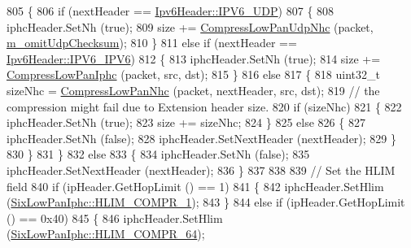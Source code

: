 \begin{DoxyCode}
805         \{
806           \textcolor{keywordflow}{if} (nextHeader == \hyperlink{classns3_1_1Ipv6Header_a226429221a066c5e3b1f260caf27d1e9aef42146d6b211521c22f827b04530253}{Ipv6Header::IPV6\_UDP})
807             \{
808               iphcHeader.SetNh (\textcolor{keyword}{true});
809               size += \hyperlink{classns3_1_1SixLowPanNetDevice_aa163cb1c6e2c82e208692f9bae9b5189}{CompressLowPanUdpNhc} (packet, 
      \hyperlink{classns3_1_1SixLowPanNetDevice_aa3503adbbb86b19e4ec2d17f3c8436f7}{m\_omitUdpChecksum});
810             \}
811           \textcolor{keywordflow}{else} \textcolor{keywordflow}{if} (nextHeader == \hyperlink{classns3_1_1Ipv6Header_a226429221a066c5e3b1f260caf27d1e9a2438a09074916d0e066627b28543ec7a}{Ipv6Header::IPV6\_IPV6})
812             \{
813               iphcHeader.SetNh (\textcolor{keyword}{true});
814               size += \hyperlink{classns3_1_1SixLowPanNetDevice_a67bf1501ba018d90c5bdb442371a3722}{CompressLowPanIphc} (packet, src, dst);
815             \}
816           \textcolor{keywordflow}{else}
817             \{
818               uint32\_t sizeNhc = \hyperlink{classns3_1_1SixLowPanNetDevice_a41d34fd1612e7e6911614fadfef6ab67}{CompressLowPanNhc} (packet, nextHeader, src, dst);
819               \textcolor{comment}{// the compression might fail due to Extension header size.}
820               \textcolor{keywordflow}{if} (sizeNhc)
821                 \{
822                   iphcHeader.SetNh (\textcolor{keyword}{true});
823                   size += sizeNhc;
824                 \}
825               \textcolor{keywordflow}{else}
826                 \{
827                   iphcHeader.SetNh (\textcolor{keyword}{false});
828                   iphcHeader.SetNextHeader (nextHeader);
829                 \}
830             \}
831         \}
832       \textcolor{keywordflow}{else}
833         \{
834           iphcHeader.SetNh (\textcolor{keyword}{false});
835           iphcHeader.SetNextHeader (nextHeader);
836         \}
837 
838 
839       \textcolor{comment}{// Set the HLIM field}
840       \textcolor{keywordflow}{if} (ipHeader.GetHopLimit () == 1)
841         \{
842           iphcHeader.SetHlim (\hyperlink{classns3_1_1SixLowPanIphc_a1fa5a18c5d53fd3583960b4ba01f093da4b6cf2f513c0ae28ea05af5fef5bf1d8}{SixLowPanIphc::HLIM\_COMPR\_1});
843         \}
844       \textcolor{keywordflow}{else} \textcolor{keywordflow}{if} (ipHeader.GetHopLimit () == 0x40)
845         \{
846           iphcHeader.SetHlim (\hyperlink{classns3_1_1SixLowPanIphc_a1fa5a18c5d53fd3583960b4ba01f093da5fd9a4fbd96256dc0338f4438664fd83}{SixLowPanIphc::HLIM\_COMPR\_64});

\end{DoxyCode}
